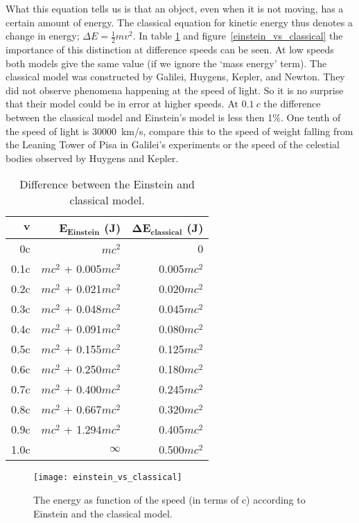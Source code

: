 What this equation tells us is that an object, even when it is not moving, has a certain amount of energy. The classical equation for kinetic energy thus denotes a change in energy; $\Delta E=\frac{1}{2}mv^2$. In table \ref{tab:einstein1} and figure~\ref{einstein_vs_classical} the importance of this distinction at difference speeds can be seen. At low speeds both models give the same value (if we ignore the `mass energy' term). The classical model was constructed by Galilei, Huygens, Kepler, and Newton. They did not observe phenomena happening at the speed of light. So it is no surprise that their model could be in error at higher speeds. At $0.1~c$ the difference between the classical model and Einstein's model is less then 1\%. One tenth of the speed of light is 30000~km/s, compare this to the speed of weight falling from the Leaning Tower of Pisa in Galilei's experiments or the speed of the celestial bodies observed by Huygens and Kepler.
\begin{table}
\centering
\begin{tabular}{|r|r|r|}
\hline $\mathbf{v}$ & $\mathbf{E_{Einstein}}$ (J) & $\mathbf{\Delta E_{classical}}$ (J) \\ 
\hline 0c & $mc^2$ & 0 \\ 
\hline 0.1c & $mc^2$ + 0.005$mc^2$ & 0.005$mc^2$ \\ 
\hline 0.2c & $mc^2$ + 0.021$mc^2$ & 0.020$mc^2$ \\ 
\hline 0.3c & $mc^2$ + 0.048$mc^2$ & 0.045$mc^2$ \\ 
\hline 0.4c & $mc^2$ + 0.091$mc^2$ & 0.080$mc^2$ \\ 
\hline 0.5c & $mc^2$ + 0.155$mc^2$ & 0.125$mc^2$ \\ 
\hline 0.6c & $mc^2$ + 0.250$mc^2$ & 0.180$mc^2$ \\ 
\hline 0.7c & $mc^2$ + 0.400$mc^2$ & 0.245$mc^2$ \\ 
\hline 0.8c & $mc^2$ + 0.667$mc^2$ & 0.320$mc^2$ \\ 
\hline 0.9c & $mc^2$ + 1.294$mc^2$ & 0.405$mc^2$ \\ 
\hline 1.0c & $\infty$ & 0.500$mc^2$ \\ 
\hline 
\end{tabular}
\caption{Difference between the Einstein and classical model.}\label{tab:einstein1}
\end{table}

\begin{figure}\begin{center}
\texttt{[image: einstein\_vs\_classical]}
\caption{The energy as function of the speed (in terms of c) according to Einstein and the classical model.}\label{fig:einstein_vs_classica}
\end{center}\end{figure}

